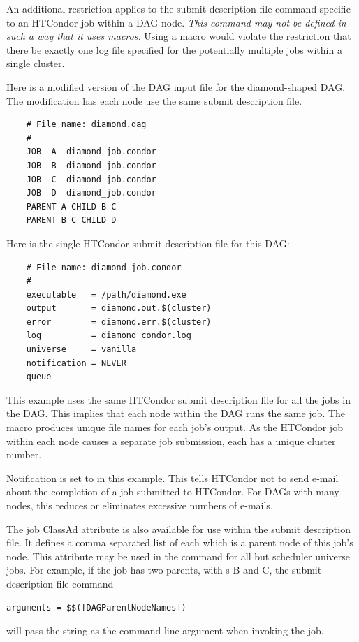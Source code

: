 An additional restriction applies to the submit description file
command  specific to an HTCondor job within
a DAG node.
\emph{This command may not be defined in such a way that it uses macros.}
Using a macro would violate the restriction that there be exactly
one log file specified for the potentially multiple jobs 
within a single cluster.

Here is a modified version of the DAG input file
for the diamond-shaped DAG. 
The modification has each node use the same 
submit description file.

\begin{verbatim}
    # File name: diamond.dag
    #
    JOB  A  diamond_job.condor 
    JOB  B  diamond_job.condor 
    JOB  C  diamond_job.condor	
    JOB  D  diamond_job.condor
    PARENT A CHILD B C
    PARENT B C CHILD D
\end{verbatim}

Here is the single HTCondor submit description file
for this DAG:

\begin{verbatim}
    # File name: diamond_job.condor
    #
    executable   = /path/diamond.exe
    output       = diamond.out.$(cluster)
    error        = diamond.err.$(cluster)
    log          = diamond_condor.log
    universe     = vanilla
    notification = NEVER
    queue
\end{verbatim}

This example uses the same HTCondor submit description file
for all the jobs in the DAG.
This implies that each node within the DAG runs the
same job.
The  macro
produces unique file names for each job's output.
As the HTCondor job within each node
causes a separate job submission, each has a unique cluster number.

Notification is set to \verb@NEVER@ in this example.
This tells HTCondor not to send e-mail about the completion of a job
submitted to HTCondor.
For DAGs with many nodes, this
reduces or eliminates excessive numbers of e-mails.

The job ClassAd attribute  is also available
for use within the submit description file. 
It defines a comma separated list of each 
which is a parent node of this job's node.
This attribute may be used in the  command
for all but scheduler universe jobs.
For example, if the job has two parents, with s B and C,
the submit description file command
\begin{verbatim}
arguments = $$([DAGParentNodeNames])
\end{verbatim}
will pass the string  as the command line argument when invoking
the job.

